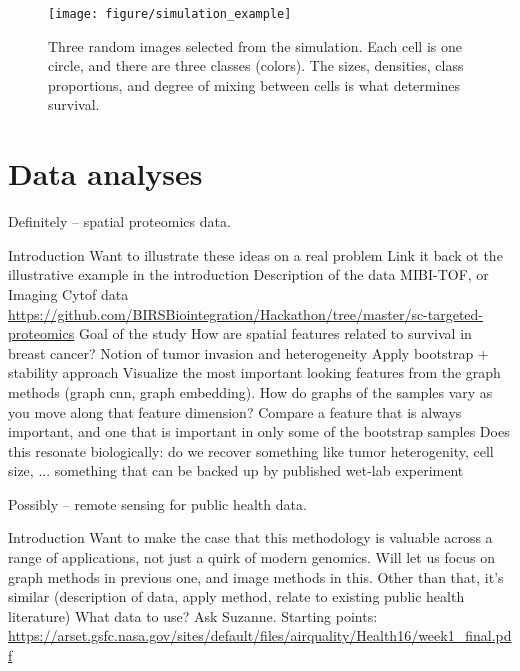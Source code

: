 \documentclass[11pt]{article}
\begin{document}
\begin{figure}
  \texttt{[image: figure/simulation\_example]}
  \caption{Three random images selected from the simulation. Each cell is one
    circle, and there are three classes (colors). The sizes, densities, class
    proportions, and degree of mixing between cells is what determines
    survival.}
\end{figure}

\section{Data analyses}

Definitely -- spatial proteomics data.

\begin{outline}
  \1 Introduction
    \2 Want to illustrate these ideas on a real problem
      \3 Link it back ot the illustrative example in the introduction
    \2 Description of the data
      \3 MIBI-TOF, or Imaging Cytof data
      \3 \url{https://github.com/BIRSBiointegration/Hackathon/tree/master/sc-targeted-proteomics}
  \1 Goal of the study
    \2 How are spatial features related to survival in breast cancer?
    \2 Notion of tumor invasion and heterogeneity
  \1 Apply bootstrap + stability approach
    \2 Visualize the most important looking features from the graph methods
    (graph cnn, graph embedding). How do graphs of the samples vary as you move
    along that feature dimension?
    \2 Compare a feature that is always important, and one that is important in
    only some of the bootstrap samples
    \2 Does this resonate biologically: do we recover something like tumor
    heterogenity, cell size, ... something that can be backed up by published
    wet-lab experiment
\end{outline}

Possibly -- remote sensing for public health data.

\begin{outline}
  \1 Introduction
    \2 Want to make the case that this methodology is valuable across a range of
    applications, not just a quirk of modern genomics.
    \2 Will let us focus on graph methods in previous one, and image methods in
    this.
    \2 Other than that, it's similar (description of data, apply method, relate
    to existing public health literature)
    \2 What data to use? Ask Suzanne.
      \3 Starting points: \url{https://arset.gsfc.nasa.gov/sites/default/files/airquality/Health16/week1_final.pdf}
\end{outline}
\end{document}
